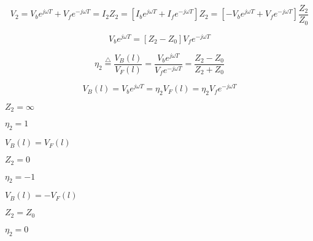 {\newpage\clearpage
{}%
\begin{displaymath} V_2=V_be^{j\omega T}+V_fe^{-j\omega T}=I_2Z_2=[I_be^{j\omega T}+I_fe^{-j\omega T}]Z_2
  =[-V_be^{j\omega T}+V_fe^{-j\omega T}]\frac{Z_2}{Z_0} \end{displaymath}%
\lthtmldisplayZ
\lthtmlcheckvsize\clearpage}

{\newpage\clearpage
{}%
\begin{displaymath} [Z_0+Z_2]V_be^{j\omega T}=[Z_2-Z_0]V_fe^{-j\omega T} \end{displaymath}%
\lthtmldisplayZ
\lthtmlcheckvsize\clearpage}

{\newpage\clearpage
{}%
\begin{displaymath}	\eta_2\stackrel{\triangle}{=}\frac{V_B(l)}{V_F(l)}
  =\frac{V_be^{j\omega T}}{V_fe^{-j\omega T}}=\frac{Z_2-Z_0}{Z_2+Z_0}	\end{displaymath}%
\lthtmldisplayZ
\lthtmlcheckvsize\clearpage}

{\newpage\clearpage
{}%
\begin{displaymath} V_B(l)=V_b e^{j\omega T}=\eta_2 V_F(l)=\eta_2 V_f e^{-j\omega T}  \end{displaymath}%
\lthtmldisplayZ
\lthtmlcheckvsize\clearpage}

{\newpage\clearpage
{}%
$Z_2=\infty$%
\lthtmlinlinemathZ
\lthtmlcheckvsize\clearpage}

{\newpage\clearpage
{}%
$\eta_2=1$%
\lthtmlinlinemathZ
\lthtmlcheckvsize\clearpage}

{\newpage\clearpage
{}%
$V_B(l)=V_F(l)$%
\lthtmlinlinemathZ
\lthtmlcheckvsize\clearpage}

{\newpage\clearpage
{}%
$Z_2=0$%
\lthtmlinlinemathZ
\lthtmlcheckvsize\clearpage}

{\newpage\clearpage
{}%
$\eta_2=-1$%
\lthtmlinlinemathZ
\lthtmlcheckvsize\clearpage}

{\newpage\clearpage
{}%
$V_B(l)=-V_F(l)$%
\lthtmlinlinemathZ
\lthtmlcheckvsize\clearpage}

{\newpage\clearpage
{}%
$Z_2=Z_0$%
\lthtmlinlinemathZ
\lthtmlcheckvsize\clearpage}

{\newpage\clearpage
{}%
$\eta_2=0$%
\lthtmlinlinemathZ
\lthtmlcheckvsize\clearpage}

